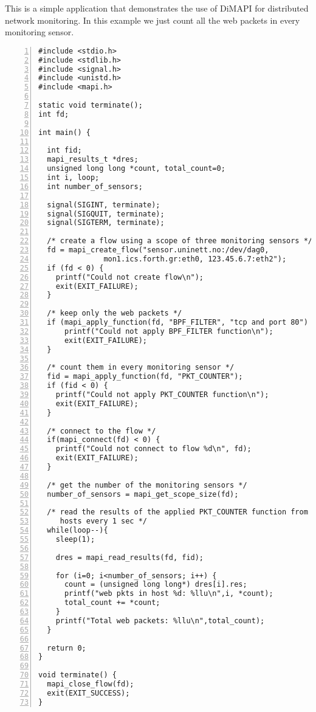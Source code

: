 \documentclass[a4paper, 11pt]{article}
\begin{document}
This is a simple application that demonstrates the use of DiMAPI for distributed network monitoring.
In this example we just count all the web packets in every monitoring sensor.


\begin{Verbatim}[numbersep=12pt, numbers=left, baselinestretch=1.0, fontsize=\small]
#include <stdio.h>
#include <stdlib.h>
#include <signal.h>
#include <unistd.h>
#include <mapi.h>

static void terminate();
int fd;

int main() {

  int fid;
  mapi_results_t *dres;
  unsigned long long *count, total_count=0;
  int i, loop;
  int number_of_sensors;

  signal(SIGINT, terminate);
  signal(SIGQUIT, terminate);
  signal(SIGTERM, terminate);

  /* create a flow using a scope of three monitoring sensors */
  fd = mapi_create_flow("sensor.uninett.no:/dev/dag0, 
               mon1.ics.forth.gr:eth0, 123.45.6.7:eth2");
  if (fd < 0) {
    printf("Could not create flow\n");
    exit(EXIT_FAILURE);
  }

  /* keep only the web packets */
  if (mapi_apply_function(fd, "BPF_FILTER", "tcp and port 80") < 0) {
      printf("Could not apply BPF_FILTER function\n");
      exit(EXIT_FAILURE);
  }

  /* count them in every monitoring sensor */
  fid = mapi_apply_function(fd, "PKT_COUNTER");
  if (fid < 0) {
    printf("Could not apply PKT_COUNTER function\n");
    exit(EXIT_FAILURE);
  }

  /* connect to the flow */
  if(mapi_connect(fd) < 0) {
    printf("Could not connect to flow %d\n", fd);
    exit(EXIT_FAILURE);
  }

  /* get the number of the monitoring sensors */
  number_of_sensors = mapi_get_scope_size(fd);
   
  /* read the results of the applied PKT_COUNTER function from all 
     hosts every 1 sec */
  while(loop--){
    sleep(1);

    dres = mapi_read_results(fd, fid);

    for (i=0; i<number_of_sensors; i++) {
      count = (unsigned long long*) dres[i].res;
      printf("web pkts in host %d: %llu\n",i, *count);
      total_count += *count;
    }
    printf("Total web packets: %llu\n",total_count);
  }
    
  return 0;
}

void terminate() {
  mapi_close_flow(fd);
  exit(EXIT_SUCCESS);
}
\end{Verbatim}
\end{document}
